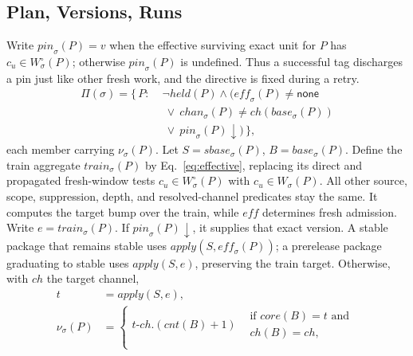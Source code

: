 \subsection{Plan, Versions, Runs}

\begin{definition}
\label{def:plan}
Write $\mathit{pin}_\sigma(P)=v$ when the effective surviving exact
 unit for $P$ has $c_u\in W^\circ_\sigma(P)$; otherwise
$\mathit{pin}_\sigma(P)$ is undefined. Thus a successful tag discharges a
pin just like other fresh work, and the directive is fixed during a retry.
\begin{equation}
\begin{aligned}
  \Pi(\sigma) = \{\, P :\;
    &\lnot\mathit{held}(P) \wedge (\mathit{eff}_\sigma(P) \neq
     \mathsf{none} \\
    &\ \lor\ \mathit{chan}_\sigma(P) \neq
     \mathit{ch}(\mathit{base}_\sigma(P))
     \\
    &\ \lor\ \mathit{pin}_\sigma(P)\downarrow) \,\},
\end{aligned}
\end{equation}
each member carrying $\nu_\sigma(P)$. Let $S=\mathit{sbase}_\sigma(P)$,
$B=\mathit{base}_\sigma(P)$. Define the train aggregate
$\mathit{train}_\sigma(P)$ by Eq.~\ref{eq:effective}, replacing its direct
and propagated fresh-window tests $c_u\in W^\circ_\sigma(P)$ with
$c_u\in W_\sigma(P)$. All other source, scope, suppression, depth, and
resolved-channel predicates stay the same. It computes the target bump over
the train, while $\mathit{eff}$ determines fresh admission. Write
$e=\mathit{train}_\sigma(P)$.
If $\mathit{pin}_\sigma(P)\downarrow$, it supplies that exact version. A stable package that
remains stable uses $\mathit{apply}(S,\mathit{eff}_\sigma(P))$; a prerelease
package graduating to stable uses $\mathit{apply}(S,e)$, preserving the
train target. Otherwise, with $\mathit{ch}$ the target channel,
\begin{equation}
\label{eq:train}
\begin{aligned}
  t &= \mathit{apply}(S, e), \\
  \nu_\sigma(P) &=
  \begin{cases}
    t\text{-}\mathit{ch}.(\mathit{cnt}(B){+}1)
      & \begin{array}{l}\text{if } \mathit{core}(B) = t\text{ and}\\
        \mathit{ch}(B) = \mathit{ch},\end{array}\\

\end{cases}
\end{aligned}
\end{equation}
\end{definition}
